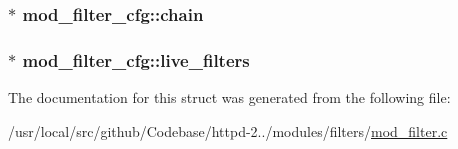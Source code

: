 \subsubsection[{\texorpdfstring{chain}{chain}}]{$\ast$ mod\+\_\+filter\+\_\+cfg\+::chain}\hypertarget{structmod__filter__cfg_a5dd26726d31254948134dd0e9e485a25}{}\label{structmod__filter__cfg_a5dd26726d31254948134dd0e9e485a25}
\subsubsection[{\texorpdfstring{live\+\_\+filters}{live_filters}}]{$\ast$ mod\+\_\+filter\+\_\+cfg\+::live\+\_\+filters}\hypertarget{structmod__filter__cfg_a6cf01a51d1ac5da5030147905268b2ff}{}\label{structmod__filter__cfg_a6cf01a51d1ac5da5030147905268b2ff}


The documentation for this struct was generated from the following file\+:\begin{DoxyCompactItemize}
\item 
/usr/local/src/github/\+Codebase/httpd-\/2../modules/filters/\hyperlink{mod__filter_8c}{mod\+\_\+filter.\+c}\end{DoxyCompactItemize}
